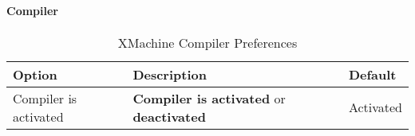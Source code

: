 \paragraph{Compiler}
\begin{EventBNoShortInline}
  \begin{table}[!htbp]
    \centering
    \begin{tabular}{|p{}|p{}|p{}|}
      \hline
      \textbf{Option} & \textbf{Description} &
                                                                                         \textbf{Default} \\
      \hline
      Compiler is activated & \textbf{Compiler is activated} or \textbf{deactivated} & Activated \\
      \hline
    \end{tabular}
    \caption{XMachine Compiler Preferences}
    \label{tab:xmachine-compiler-preference}
  \end{table}
\end{EventBNoShortInline}

